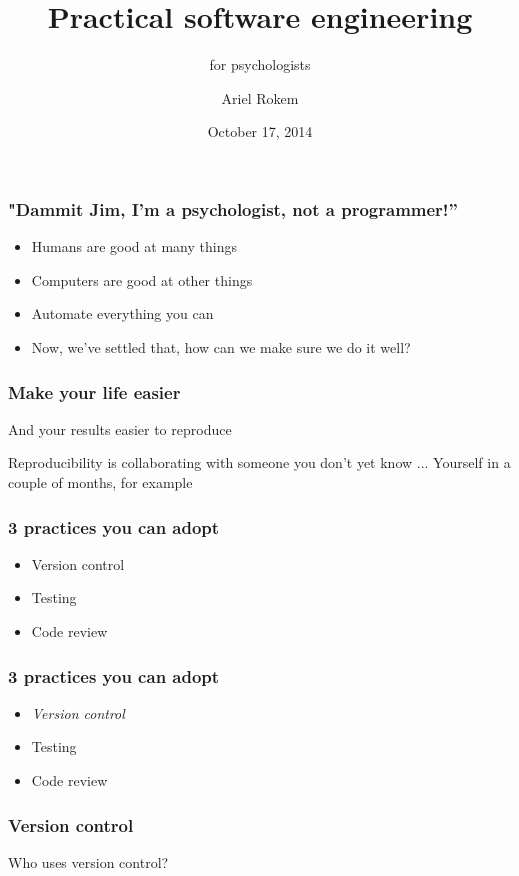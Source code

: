 \documentclass{beamer}
\title[Practical software engineering]{Practical software engineering }
\subtitle{for psychologists}
\author[Ariel Rokem]
{Ariel Rokem}
\date{October 17, 2014}
\institute[Stanford University]
{Stanford University}
\begin{document}
\begin{frame}
  \titlepage

\end{frame}

\begin{frame}
\frametitle{"Dammit Jim, I'm a psychologist, not a programmer!''}
\begin{itemize}
\pause
\item
Humans are good at many things
\pause
\item 
Computers are good at other things
\pause
\item
Automate everything you can
\pause
\item
Now, we've settled that, how can we make sure we do it well? 
\end{itemize}
\end{frame}

\begin{frame}
\frametitle{Make your life easier}
\pause
And your results easier to reproduce
\end{frame}

\begin{frame}
\pause
Reproducibility is collaborating with someone you don't yet know
\pause 
... Yourself in a couple of months, for example
\end{frame}

\begin{frame}
\frametitle{3 practices you can adopt}
\begin{itemize}
\pause
\item
Version control
\pause
\item
Testing
\pause
\item
Code review 
\end{itemize}
\end{frame}

\begin{frame}
\frametitle{3 practices you can adopt}
\begin{itemize}
\item
\emph{Version control}
\item
Testing
\item
Code review 
\end{itemize}
\end{frame}

\begin{frame}
\frametitle{Version control}
Who uses version control?
\end{frame}
\end{document}
